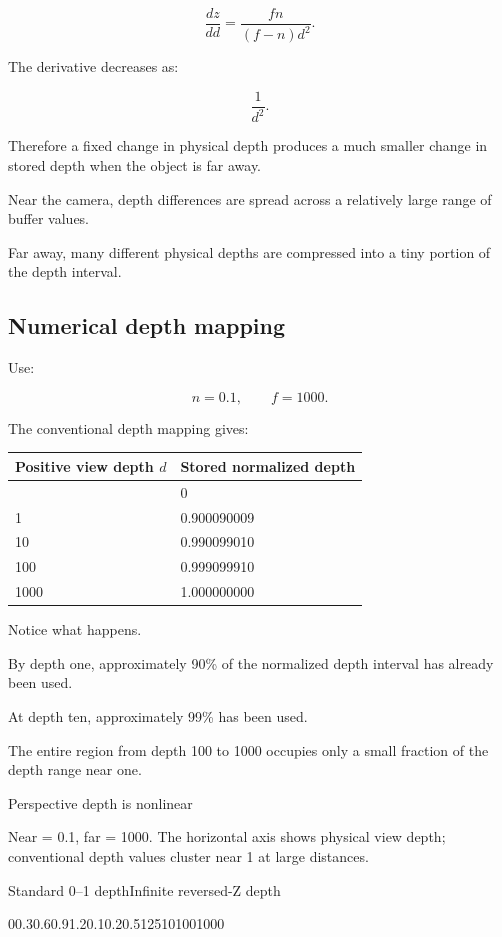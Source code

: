 \[
 \boxed{ \frac{dz}{dd} = \frac{fn}{(f-n)d^2} }.
\]

The derivative decreases as:

\[
 \frac1{d^2}.
\]

Therefore a fixed change in physical depth produces a much smaller change in stored depth when the object is far away.

Near the camera, depth differences are spread across a relatively large range of buffer values.

Far away, many different physical depths are compressed into a tiny portion of the depth interval.

\subsection{Numerical depth mapping}\label{02-foundations-ii-ch033-numerical-depth-mapping}

Use:

\[
 n=0.1,\qquad f=1000.
\]

The conventional depth mapping gives:

{\def\LTcaptype{none} %
\begin{longtable}[]{@{}ll@{}}
\toprule\noalign{}
Positive view depth \(d\) & Stored normalized depth \\
\midrule\noalign{}
\endhead
\bottomrule\noalign{}
\endlastfoot
0.1 & 0 \\
1 & 0.900090009 \\
10 & 0.990099010 \\
100 & 0.999099910 \\
1000 & 1.000000000 \\
\end{longtable}
}

Notice what happens.

By depth one, approximately 90\% of the normalized depth interval has already been used.

At depth ten, approximately 99\% has been used.

The entire region from depth 100 to 1000 occupies only a small fraction of the depth range near one.

Perspective depth is nonlinear

Near = 0.1, far = 1000. The horizontal axis shows physical view depth; conventional depth values cluster near 1 at large distances.

Standard 0--1 depthInfinite reversed-Z depth

00.30.60.91.20.10.20.5125101001000


